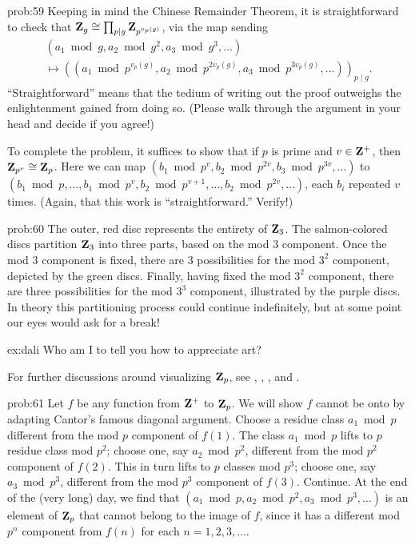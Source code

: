 \begin{sol}{prob:59} Keeping in mind the Chinese Remainder Theorem, it is straightforward to check that $\mathbf{Z}_{g} \cong \prod_{p\mid g} \mathbf{Z}_{p^{v_p(g)}}$, via the map sending
\begin{multline*} (a_1\bmod{g}, a_2\bmod{g^2}, a_3\bmod{g^3},\dots) \\ \mapsto ((a_1\bmod{p^{v_p(g)}}, a_2\bmod{p^{2v_p(g)}}, a_3\bmod{p^{3v_p(g)}}, \dots))_{p\mid g}. \end{multline*} 
``Straightforward'' means that the tedium of writing out the proof outweighs the enlightenment gained from doing so. (Please walk through the argument in your head and decide if you agree!)

To complete the problem, it suffices to show that if $p$ is prime and $v \in \mathbf{Z}^{+}$, then $\mathbf{Z}_{p^v} \cong \mathbf{Z}_p$. Here we can map $(b_1\bmod{p^v}, b_2\bmod{p^{2v}}, b_3\bmod{p^{3v}}, \dots)$ to $(b_1\bmod{p},\dots, b_1\bmod{p^v},b_2\bmod{p^{v+1}},\dots,b_2\bmod{p^{2v}}, \dots)$, each $b_i$ repeated $v$ times. (Again, that this work is ``straightforward.'' Verify!)
\end{sol}



\begin{sol}{prob:60} The outer, red disc represents the entirety of $\mathbf{Z}_3$. The salmon-colored discs partition $\mathbf{Z}_3$ into three parts, based on  the mod $3$ component. Once the mod $3$ component is fixed, there are $3$ possibilities for the mod $3^2$ component, depicted by the green discs. Finally, having fixed the mod $3^2$ component, there are three possibilities for the mod $3^3$ component, illustrated by the purple discs. In theory this partitioning process could continue indefinitely, but at some point our eyes would ask for a break!

\begin{sol}{ex:dali} Who am I to tell you how to appreciate art?
\end{sol}

\begin{rmk} For further discussions around visualizing $\mathbf{Z}_p$, see \cite{cuoco91}, \cite{holly}, \cite[Chapter 2]{katok}, and \cite[Chapter 1, \S2]{robert}. 
\end{rmk}
\end{sol}

\begin{sol}{prob:61}  Let $f$ be any function from $\mathbf{Z}^{+}$ to $\mathbf{Z}_p$. We will show $f$ cannot be onto by adapting Cantor's famous \textsf{diagonal argument}. Choose a residue class $a_1\bmod{p}$ different from the mod $p$ component of $f(1)$. The class $a_1\bmod{p}$ lifts to $p$ residue class mod $p^2$; choose one, say $a_2\bmod{p^2}$, different from the mod $p^2$ component of  $f(2)$. This in turn lifts to $p$ classes mod $p^3$; choose one, say $a_3\bmod{p^3}$, different from the mod $p^3$ component of $f(3)$. Continue. At the end of the (very long) day, we find that $(a_1\bmod{p}, a_2\bmod{p^2}, a_3\bmod{p^3}, \dots)$ is an element of $\mathbf{Z}_{p}$ that cannot belong to the image of $f$, since it has a different mod $p^n$ component from $f(n)$ for each $n=1,2,3,\dots$. 
\end{sol}

